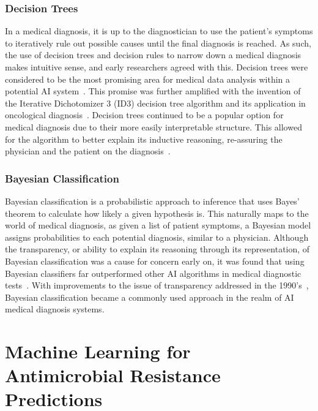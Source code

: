 \documentclass{article}
\begin{document}
\subsubsection{Decision Trees}
In a medical diagnosis, it is up to the diagnostician to use the patient's symptoms to iteratively rule out possible causes until the final diagnosis is reached. As such, the use of decision trees and decision rules to narrow down a medical diagnosis makes intuitive sense, and early researchers agreed with this. Decision trees were considered to be the most promising area for medical data analysis within a potential AI system~\cite{kononenko_machine_2001}. This promise was further amplified with the invention of the Iterative Dichotomizer 3 (ID3) decision tree algorithm and its application in oncological diagnosis~\cite{kononenko_machine_2001}. Decision trees continued to be a popular option for medical diagnosis due to their more easily interpretable structure. This allowed for the algorithm to better explain its inductive reasoning, re-assuring the physician and the patient on the diagnosis~\cite{kononenko_machine_2001}. 

\subsubsection{Bayesian Classification}
Bayesian classification is a probabilistic approach to inference that uses Bayes' theorem to calculate how likely a given hypothesis is. This naturally maps to the world of medical diagnosis, as given a list of patient symptoms, a Bayesian model assigns probabilities to each potential diagnosis, similar to a physician. Although the transparency, or ability to explain its reasoning through its representation, of Bayesian classification was a cause for concern early on, it was found that using Bayesian classifiers far outperformed other AI algorithms in medical diagnostic tests~\cite{kononenko_machine_2001}. With improvements to the issue of transparency addressed in the 1990's~\cite{kononenko_machine_2001}, Bayesian classification became a commonly used approach in the realm of AI medical diagnosis systems.  

\newpage

\section{Machine Learning for Antimicrobial Resistance Predictions}
\end{document}
